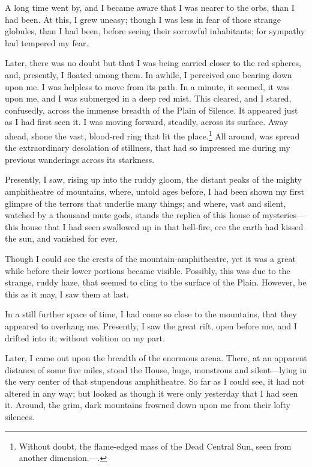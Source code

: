 A long time went by, and I became aware that I was nearer to the orbs, than I had been. At this, I grew uneasy; though I was less in fear of those strange globules, than I had been, before seeing their sorrowful inhabitants; for sympathy had tempered my fear.

Later, there was no doubt but that I was being carried closer to the red spheres, and, presently, I floated among them. In awhile, I perceived one bearing down upon me. I was helpless to move from its path. In a minute, it seemed, it was upon me, and I was submerged in a deep red mist. This cleared, and I stared, confusedly, across the immense breadth of the Plain of Silence. It appeared just as I had first seen it. I was moving forward, steadily, across its surface. Away ahead, shone the vast, blood-red ring that lit the place.\footnote{Without doubt, the flame-edged mass of the Dead Central Sun, seen from another dimension.---.} All around, was spread the extraordinary desolation of stillness, that had so impressed me during my previous wanderings across its starkness.

Presently, I saw, rising up into the ruddy gloom, the distant peaks of the mighty amphitheatre of mountains, where, untold ages before, I had been shown my first glimpse of the terrors that underlie many things; and where, vast and silent, watched by a thousand mute gods, stands the replica of this house of mysteries---this house that I had seen swallowed up in that hell-fire, ere the earth had kissed the sun, and vanished for ever.

Though I could see the crests of the mountain-amphitheatre, yet it was a great while before their lower portions became visible. Possibly, this was due to the strange, ruddy haze, that seemed to cling to the surface of the Plain. However, be this as it may, I saw them at last.

In a still further space of time, I had come so close to the mountains, that they appeared to overhang me. Presently, I saw the great rift, open before me, and I drifted into it; without volition on my part.

Later, I came out upon the breadth of the enormous arena. There, at an apparent distance of some five miles, stood the House, huge, monstrous and silent---lying in the very center of that stupendous amphitheatre. So far as I could see, it had not altered in any way; but looked as though it were only yesterday that I had seen it. Around, the grim, dark mountains frowned down upon me from their lofty silences.

